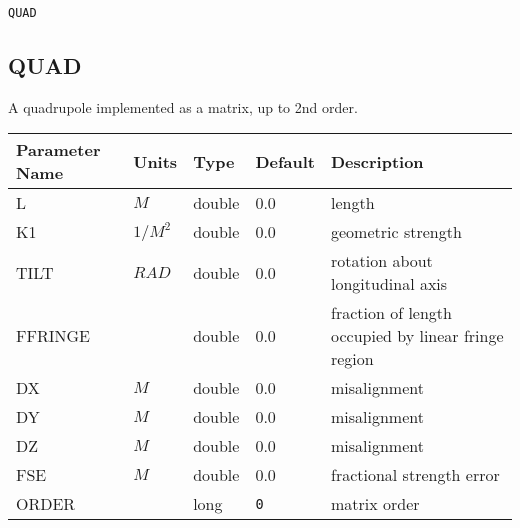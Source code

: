 \begin{latexonly}
\newpage
\begin{center}{\Large\verb|QUAD|}\end{center}
\end{latexonly}\subsection{QUAD}
A quadrupole implemented as a matrix, up to 2nd order.
\\
\begin{tabular}{|l|l|l|l|p{\descwidth}|} \hline
Parameter Name & Units & Type & Default & Description \\ \hline 
L & $M$ & double &  0.0 & length  \\ \hline 
K1 & $1/M^{2}$ & double &  0.0 & geometric strength  \\ \hline 
TILT & $RAD$ & double &  0.0 & rotation about longitudinal axis  \\ \hline 
FFRINGE &  & double &  0.0 & fraction of length occupied by linear fringe region  \\ \hline 
DX & $M$ & double &  0.0 & misalignment  \\ \hline 
DY & $M$ & double &  0.0 & misalignment  \\ \hline 
DZ & $M$ & double &  0.0 & misalignment  \\ \hline 
FSE & $M$ & double &  0.0 & fractional strength error  \\ \hline 
ORDER &  & long &  \verb|0| & matrix order  \\ \hline 
\end{tabular}

